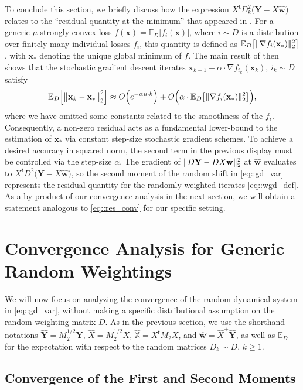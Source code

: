 \documentclass{article}
\newcommand*{\E}{\mathbb{E}} %
\newcommand*{\bbE}{\mathbb{E}}
\newcommand*{\bbX}{\mathbb{X}}
\newcommand*{\bfY}{\mathbf{Y}}
\newcommand*{\bfw}{\mathbf{w}}
\newcommand*{\bfx}{\mathbf{x}}
\newcommand*{\pinv}{^{+}}
\newcommand*{\tran}{^{\mathsf{t}}}
\DeclarePairedDelimiter{\norm}{\lVert}{\rVert}
\newcommand{\whweight}{\widehat{\bfw}}
\newcommand{\whX}{\widehat{X}}
\newcommand{\whbbX}{\widehat{\bbX}}
\newcommand{\whY}{\widehat{\bfY}}
\begin{document}
To conclude this section, we briefly discuss how the expression $X\tran D_k^2
\big(\bfY - X \whweight\big)$ relates to the ``residual quantity at the
minimum'' that appeared in \cite{needell_srebro_et_al_2014}. For a generic
$\mu$-strongly convex loss $f(\bfx) = \E_D\big[f_i(\bfx)\big]$, where $i \sim D$
is a distribution over finitely many individual losses $f_i$, this quantity is
defined as $\E_D\big[\norm{\nabla f_i(\bfx_*)}_2^2\big]$, with $\bfx_*$ denoting
the unique global minimum of $f$. The main result of
\cite{needell_srebro_et_al_2014} then shows that the stochastic gradient descent
iterates $\bfx_{k + 1} - \alpha \cdot \nabla f_{i_k}(\bfx_k)$, $i_k \sim
D$ satisfy \begin{align}
  \label{eq::res_conv}
  \E_D\Big[\norm[\big]{\bfx_k - \bfx_*}_2^2\Big] \approx O\Big(e^{- \alpha \mu
  \cdot k}\Big) + O\Big(\alpha \cdot \E_D\big[\norm{\nabla
  f_i(\bfx_*)}_2^2\big]\Big),
\end{align} where we have omitted some constants related to the smoothness of
the $f_i$. Consequently, a non-zero residual acts as a fundamental lower-bound
to the estimation of $\bfx_*$ via constant step-size stochastic gradient
schemes. To achieve a desired accuracy in squared norm, the second term in the
previous display must be controlled via the step-size $\alpha$. The gradient of
$\norm{D \bfY - D X \bfw}_2^2$ at $\whweight$ evaluates to $X\tran D^2 \big(\bfY
- X \whweight\big)$, so the second moment of the random shift in
\eqref{eq::gd_var} represents the residual quantity for the randomly weighted
iterates \eqref{eq::wgd_def}. As a by-product of our convergence analysis in the
next section, we will obtain a statement analogous to \eqref{eq::res_conv} for
our specific setting.

\section{Convergence Analysis for Generic Random Weightings}
\label{sec::conv_res_iso}

We will now focus on analyzing the convergence of the random dynamical system in
\eqref{eq::gd_var}, without making a specific distributional assumption on the
random weighting matrix $D$. As in the previous section, we use the shorthand
notations $\whY = M_2^{1 / 2} \bfY$, $\whX = M_2^{1 / 2} X$, $\whbbX = X\tran
M_2 X$, and $\whweight = \whX\pinv \whY$, as well as $\bbE_D$ for the
expectation with respect to the random matrices $D_k \sim D$, $k \geq 1$.

\subsection{Convergence of the First and Second Moments}
\end{document}
